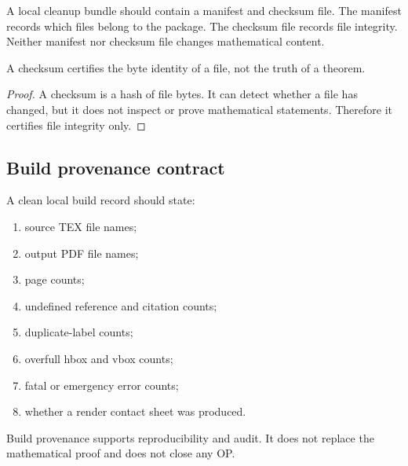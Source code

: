 \begin{definition}
\label{def:v4013-manifest-checksum-hygiene-rule}
A local cleanup bundle should contain a manifest and checksum file. The
manifest records which files belong to the package. The checksum file records
file integrity. Neither manifest nor checksum file changes mathematical
content.
\end{definition}

\begin{proposition}
\label{prop:v4013-checksums-certify-files-not-theorems}
A checksum certifies the byte identity of a file, not the truth of a theorem.
\end{proposition}

\begin{proof}
A checksum is a hash of file bytes. It can detect whether a file has changed,
but it does not inspect or prove mathematical statements. Therefore it
certifies file integrity only.
\end{proof}

\subsection{Build provenance contract}
\label{subsec:v4013-build-provenance-contract}

\begin{definition}
\label{def:v4013-build-provenance-contract}
A clean local build record should state:
\begin{enumerate}[leftmargin=*]
 \item source TEX file names;
 \item output PDF file names;
 \item page counts;
 \item undefined reference and citation counts;
 \item duplicate-label counts;
 \item overfull hbox and vbox counts;
 \item fatal or emergency error counts;
 \item whether a render contact sheet was produced.
\end{enumerate}
\end{definition}

\begin{remark}
\label{rem:v4013-build-provenance-audit-support}
Build provenance supports reproducibility and audit. It does not replace the
mathematical proof and does not close any OP.
\end{remark}

